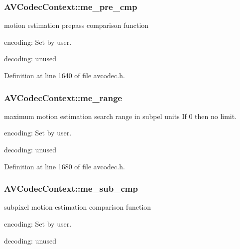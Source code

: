 \subsubsection[{\texorpdfstring{me\+\_\+pre\+\_\+cmp}{me_pre_cmp}}]{ A\+V\+Codec\+Context\+::me\+\_\+pre\+\_\+cmp}\hypertarget{struct_a_v_codec_context_ac05e5676655afdc05a83c06a90f3eea7}{}\label{struct_a_v_codec_context_ac05e5676655afdc05a83c06a90f3eea7}
motion estimation prepass comparison function
\begin{DoxyItemize}
\item encoding\+: Set by user.
\item decoding\+: unused 
\end{DoxyItemize}

Definition at line 1640 of file avcodec.\+h.

\subsubsection[{\texorpdfstring{me\+\_\+range}{me_range}}]{ A\+V\+Codec\+Context\+::me\+\_\+range}\hypertarget{struct_a_v_codec_context_ad16d78b369781e09d14343788284300a}{}\label{struct_a_v_codec_context_ad16d78b369781e09d14343788284300a}
maximum motion estimation search range in subpel units If 0 then no limit.


\begin{DoxyItemize}
\item encoding\+: Set by user.
\item decoding\+: unused 
\end{DoxyItemize}

Definition at line 1680 of file avcodec.\+h.

\subsubsection[{\texorpdfstring{me\+\_\+sub\+\_\+cmp}{me_sub_cmp}}]{ A\+V\+Codec\+Context\+::me\+\_\+sub\+\_\+cmp}\hypertarget{struct_a_v_codec_context_a76d47cbb639922fee05ce6057d95457c}{}\label{struct_a_v_codec_context_a76d47cbb639922fee05ce6057d95457c}
subpixel motion estimation comparison function
\begin{DoxyItemize}
\item encoding\+: Set by user.
\item decoding\+: unused 
\end{DoxyItemize}

